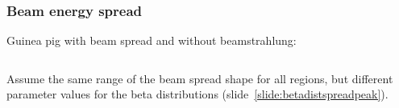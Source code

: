 \documentclass{beamer}
\begin{document}
\begin{frame}
\frametitle{Beam energy spread}\label{slide:beamspread}
Guinea pig \alert{with} beam spread and \alert{without} beamstrahlung:\\
\begin{columns}[c]
\column{6cm}
\column{6cm}
\end{columns}
Assume the same range of the beam spread shape for all regions,
but different parameter values for the beta distributions (slide~\ref{slide:betadistspreadpeak}).
\end{frame}
\end{document}
